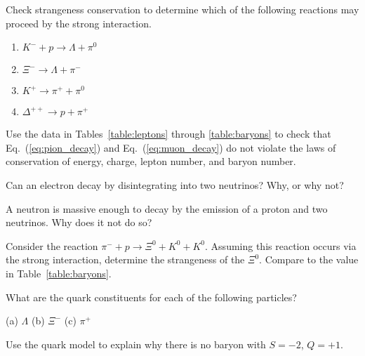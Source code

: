 \begin{problem}
Check strange\-ness conservation to determine which of the
  following reactions may proceed by the strong interaction.
  \begin{enumerate}
  \item $K^- + p \to \Lambda + \pi^0$
  \item $\Xi^- \to \Lambda + \pi^-$
  \item $K^+ \to \pi^+ + \pi^0$
  \item $\Delta^{++} \to p + \pi^+$
  \end{enumerate}
\label{prob:strangeness_and_strong_force}
\end{problem}

\begin{problem}
Use the data in Tables~\ref{table:leptons} through 
  \ref{table:baryons} to check that Eq.~(\ref{eq:pion_decay}) and
  Eq.~(\ref{eq:muon_decay}) do not violate the laws of conservation of
  energy, charge, lepton number, and baryon number.
\label{prob:pion_and_muon_decay}
\end{problem}

\begin{problem}
Can an electron decay by disintegrating into two neutrinos?
  Why, or why not?
\label{prob:electron_stability}
\end{problem}

\begin{problem}
A neutron is massive enough to decay by the emission of a proton
  and two neutrinos.  Why does it not do so?
\label{prob:neutron_decay}
\end{problem}

\begin{problem}
Consider the reaction $\pi^- + p \to \Xi^0 + K^0 + K^0$.
  Assuming this reaction occurs via the strong interaction, determine
  the strange\-ness of the $\Xi^0$.  Compare to the value in
  Table~\ref{table:baryons}.
\label{prob:Xi0_strangeness}
\end{problem}

\begin{problem}
What are the quark constituents for each of the following
  particles?  \par  \medskip
  (a)  $\Lambda$ \qquad\qquad (b) $\Xi^-$ \qquad\qquad (c)  $\pi^+$
\label{prob:quark_constituents}
\end{problem}

\begin{problem}
Use the quark model to explain why there is no baryon with
$S = -2$, $Q = +1$.
\label{prob:quark_model}
\end{problem}

